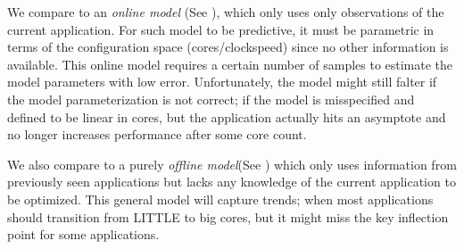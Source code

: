 




We compare \SYSTEM{} to an \emph{online model} (See ), which only uses only
observations of the current application.  For such model to be
predictive, it must be parametric in terms of the configuration space
(cores/clockspeed) since no other information is available. This
online model requires a certain number of samples to estimate the
model parameters with low error.  Unfortunately, the model might still
falter if the model parameterization is not correct; \eg{} if the model
is misspecified and defined to be linear in cores, but the application
actually hits an asymptote and no longer increases performance after
some core count.

We also compare \SYSTEM{} to a purely \emph{offline model}(See ) which only
uses information from previously seen applications but lacks any
knowledge of the current application to be optimized. This general
model will capture trends; \eg{} when most applications should
transition from LITTLE to big cores, but it might miss the key
inflection point for some applications.

